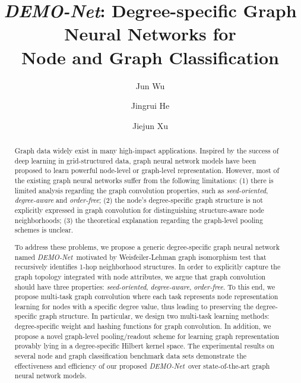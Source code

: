 \documentclass[sigconf]{acmart}
\newcommand{\demonet}{{\emph {DEMO-Net}}}
\begin{document}
\title{\demonet: Degree-specific Graph Neural Networks for\\ Node and Graph Classification}


\author{Jun Wu}

\author{Jingrui He}

\author{Jiejun Xu}

\renewcommand{\shortauthors}{Trovato and Tobin, et al.}

\begin{abstract}
Graph data widely exist in many high-impact applications. Inspired by the success of deep learning in grid-structured data, graph neural network models have been proposed to learn powerful node-level or graph-level representation. However, most of the existing graph neural networks suffer from the following limitations: (1) there is limited analysis regarding the graph convolution properties, such as {\em seed-oriented}, {\em degree-aware} and {\em order-free}; (2) the node's degree-specific graph structure is not explicitly expressed in graph convolution for distinguishing structure-aware node neighborhoods; (3) the theoretical explanation regarding the graph-level pooling schemes is unclear.

To address these problems, we propose a generic degree-specific graph neural network named \demonet\ motivated by Weisfeiler-Lehman graph isomorphism test that recursively identifies 1-hop neighborhood structures. In order to explicitly capture the graph topology integrated with node attributes, we argue that graph convolution should have three properties: {\em seed-oriented}, {\em degree-aware}, {\em order-free}. To this end, we propose multi-task graph convolution where each task represents node representation learning for nodes with a specific degree value, thus leading to preserving the degree-specific graph structure. In particular, we design two multi-task learning methods: degree-specific weight and hashing functions for graph convolution. In addition, we propose a novel graph-level pooling/readout scheme for learning graph representation provably lying in a degree-specific Hilbert kernel space. The experimental results on several node and graph classification benchmark data sets demonstrate the effectiveness and efficiency of our proposed \demonet\ over state-of-the-art graph neural network models.
\end{abstract}
\end{document}

